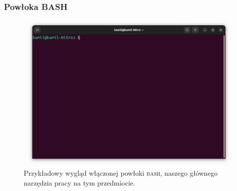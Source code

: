 \documentclass[10pt,t]{beamer}
\begin{document}
\begin{frame}
  \frametitle{Powłoka BASH}

  \vspace{-0.5em}


  \begin{figure}

    \centering


    \includegraphics[scale=0.23]
    {./Presentations-pictures/Miscancellous-pictures/BASH-shell.png}


    \caption{Przykładowy wygląd włączonej powłoki \textsc{bash}, naszego
      głównego narzędzia pracy na tym przedmiocie.}


    \label{fig:BASH-shell}

  \end{figure}

\end{frame}
\end{document}
